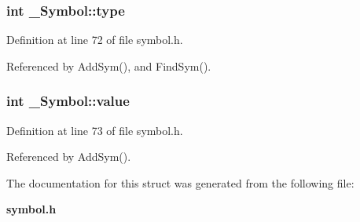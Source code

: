 \subsubsection{\setlength{\rightskip}{0pt plus 5cm}int \bf{\_\-Symbol::type}}\label{struct__Symbol_b21c4b0cb0f6a516fb941e775a959781}




Definition at line 72 of file symbol.h.

Referenced by Add\-Sym(), and Find\-Sym().
\subsubsection{\setlength{\rightskip}{0pt plus 5cm}int \bf{\_\-Symbol::value}}\label{struct__Symbol_ce01c1c5d7713926010c8107bcfa8534}




Definition at line 73 of file symbol.h.

Referenced by Add\-Sym().

The documentation for this struct was generated from the following file:\begin{CompactItemize}
\item 
\bf{symbol.h}\end{CompactItemize}
